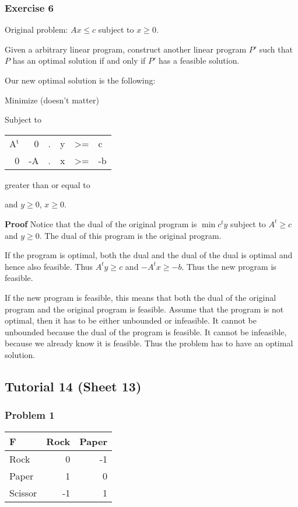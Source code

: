\documentclass[11pt]{article}
\def\min{\operatorname{min}}
\begin{document}
\subsubsection{Exercise 6}
\label{sec:org700dab9}
Original problem: \(Ax \le c\) subject to \(x \ge 0\).

Given a arbitrary linear program, construct another linear program \(P'\) such
that \(P\) has an optimal solution if and only if \(P'\) has a feasible solution.

Our new optimal solution is the following:

Minimize (doesn't matter)

Subject to 

\begin{center}
\begin{tabular}{rrllll}
A\(^{\text{t}}\) & 0 & . & y & >= & c\\
0 & -A & . & x & >= & -b\\
\end{tabular}
\end{center}

greater than or equal to

and \(y \ge 0\), \(x \ge 0\).

\textbf{Proof} Notice that the dual of the original program is \(\min c^t y\)
subject to \(A^t \ge c\) and \(y \ge 0\). The dual of this program is the
original program.

If the program is optimal, both the dual and the dual of the dual is optimal
and hence also feasible. Thus \(A^t y \ge c\) and \(-A^tx \ge -b\). Thus the new
program is feasible.

If the new program is feasible, this means that both the dual of the
original program and the original program is feasible. Assume that the
program is not optimal, then it has to be either unbounded or infeasible. It
cannot be unbounded because the dual of the program is feasible. It cannot
be infeasible, because we already know it is feasible. Thus the problem has
to have an optimal solution.
\subsection{Tutorial 14 (Sheet 13)}
\label{sec:org4d4e560}
\subsubsection{Problem 1}
\label{sec:orgac251b7}
\begin{center}
\begin{tabular}{lrr}
F\D & Rock & Paper\\
\hline
Rock & 0 & -1\\
Paper & 1 & 0\\
Scissor & -1 & 1\\
\end{tabular}
\end{center}
\end{document}
